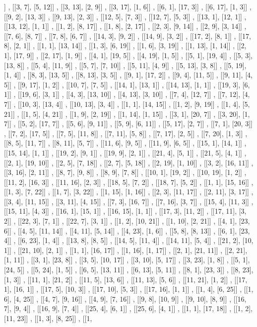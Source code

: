 \documentclass[a4paper, 12pt]{article}
\begin{document}
\begin{footnotesize}
[7, 12]] , [[3, 7], [5, 12]] , [[3, 13], [2, 9]] , [[3, 17], [1, 6]] , [[6, 1], [17, 3]] , [[6, 17], [1, 3]] , [[9, 2], [13, 3]] , [[9, 13], [2, 3]] , [[12, 5], [7, 3]] , [[12, 7], [5, 3]] , [[13, 1], [12, 1]] , [[13, 12], [1, 1]] , [[1, 2], [8, 17]] , [[1, 8], [2, 17]] , [[2, 3], [9, 14]] , [[2, 9], [3, 14]] , [[7, 6], [8, 7]] , [[7, 8], [6, 7]] , [[14, 3], [9, 2]] , [[14, 9], [3, 2]] , [[17, 2], [8, 1]] , [[17, 8], [2, 1]] , [[1, 1], [13, 14]] , [[1, 3], [6, 19]] , [[1, 6], [3, 19]] , [[1, 13], [1, 14]] , [[2, 1], [17, 9]] , [[2, 17], [1, 9]] , [[4, 1], [19, 5]] , [[4, 19], [1, 5]] , [[5, 1], [19, 4]] , [[5, 3], [13, 8]] , [[5, 4], [11, 9]] , [[5, 7], [7, 10]] , [[5, 11], [4, 9]] , [[5, 13], [3, 8]] , [[5, 19], [1, 4]] , [[8, 3], [13, 5]] , [[8, 13], [3, 5]] , [[9, 1], [17, 2]] , [[9, 4], [11, 5]] , [[9, 11], [4, 5]] , [[9, 17], [1, 2]] , [[10, 7], [7, 5]] , [[14, 1], [13, 1]] , [[14, 13], [1, 1]] , [[19, 3], [6, 1]] , [[19, 6], [3, 1]] , [[4, 3], [13, 10]] , [[4, 13], [3, 10]] , [[7, 4], [12, 7]] , [[7, 12], [4, 7]] , [[10, 3], [13, 4]] , [[10, 13], [3, 4]] , [[1, 1], [14, 15]] , [[1, 2], [9, 19]] , [[1, 4], [5, 21]] , [[1, 5], [4, 21]] , [[1, 9], [2, 19]] , [[1, 14], [1, 15]] , [[3, 1], [20, 7]] , [[3, 20], [1, 7]] , [[5, 2], [17, 7]] , [[5, 6], [9, 11]] , [[5, 9], [6, 11]] , [[5, 17], [2, 7]] , [[7, 1], [20, 3]] , [[7, 2], [17, 5]] , [[7, 5], [11, 8]] , [[7, 11], [5, 8]] , [[7, 17], [2, 5]] , [[7, 20], [1, 3]] , [[8, 5], [11, 7]] , [[8, 11], [5, 7]] , [[11, 6], [9, 5]] , [[11, 9], [6, 5]] , [[15, 1], [14, 1]] , [[15, 14], [1, 1]] , [[19, 2], [9, 1]] , [[19, 9], [2, 1]] , [[21, 4], [5, 1]] , [[21, 5], [4, 1]] , [[2, 1], [19, 10]] , [[2, 5], [7, 18]] , [[2, 7], [5, 18]] , [[2, 19], [1, 10]] , [[3, 2], [16, 11]] , [[3, 16], [2, 11]] , [[8, 7], [9, 8]] , [[8, 9], [7, 8]] , [[10, 1], [19, 2]] , [[10, 19], [1, 2]] , [[11, 2], [16, 3]] , [[11, 16], [2, 3]] , [[18, 5], [7, 2]] , [[18, 7], [5, 2]] , [[1, 1], [15, 16]] , [[1, 3], [7, 22]] , [[1, 7], [3, 22]] , [[1, 15], [1, 16]] , [[2, 3], [11, 17]] , [[2, 11], [3, 17]] , [[3, 4], [11, 15]] , [[3, 11], [4, 15]] , [[7, 3], [16, 7]] , [[7, 16], [3, 7]] , [[15, 4], [11, 3]] , [[15, 11], [4, 3]] , [[16, 1], [15, 1]] , [[16, 15], [1, 1]] , [[17, 3], [11, 2]] , [[17, 11], [3, 2]] , [[22, 3], [7, 1]] , [[22, 7], [3, 1]] , [[1, 2], [10, 21]] , [[1, 10], [2, 21]] , [[4, 1], [23, 6]] , [[4, 5], [11, 14]] , [[4, 11], [5, 14]] , [[4, 23], [1, 6]] , [[5, 8], [8, 13]] , [[6, 1], [23, 4]] , [[6, 23], [1, 4]] , [[13, 8], [8, 5]] , [[14, 5], [11, 4]] , [[14, 11], [5, 4]] , [[21, 2], [10, 1]] , [[21, 10], [2, 1]] , [[1, 1], [16, 17]] , [[1, 16], [1, 17]] , [[2, 1], [21, 11]] , [[2, 21], [1, 11]] , [[3, 1], [23, 8]] , [[3, 5], [10, 17]] , [[3, 10], [5, 17]] , [[3, 23], [1, 8]] , [[5, 1], [24, 5]] , [[5, 24], [1, 5]] , [[6, 5], [13, 11]] , [[6, 13], [5, 11]] , [[8, 1], [23, 3]] , [[8, 23], [1, 3]] , [[11, 1], [21, 2]] , [[11, 5], [13, 6]] , [[11, 13], [5, 6]] , [[11, 21], [1, 2]] , [[17, 1], [16, 1]] , [[17, 5], [10, 3]] , [[17, 10], [5, 3]] , [[17, 16], [1, 1]] , [[1, 4], [6, 25]] , [[1, 6], [4, 25]] , [[4, 7], [9, 16]] , [[4, 9], [7, 16]] , [[9, 8], [10, 9]] , [[9, 10], [8, 9]] , [[16, 7], [9, 4]] , [[16, 9], [7, 4]] , [[25, 4], [6, 1]] , [[25, 6], [4, 1]] , [[1, 1], [17, 18]] , [[1, 2], [11, 23]] , [[1, 3], [8, 25]] , [[1, 
\end{footnotesize}
\end{document}

